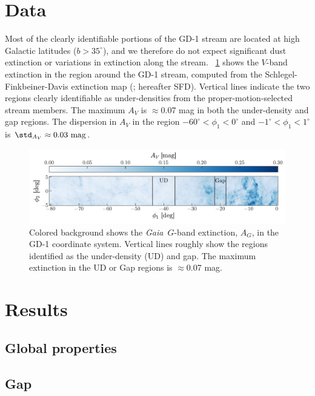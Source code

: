 \documentclass[modern]{aastex62}
\newcommand{\gaia}{\textsl{Gaia}}
\begin{document}
\section{Data}
\label{sec:data}


Most of the clearly identifiable portions of the GD-1 stream are located at high
Galactic latitudes ($b > 35^\circ$), and we therefore do not expect significant
dust extinction or variations in extinction along the stream.
\figurename~\ref{fig:sfd} shows the $V$-band extinction in the region around the
GD-1 stream, computed from the Schlegel-Finkbeiner-Davis extinction map
(\cite{Schlegel:1998}; hereafter SFD).
Vertical lines indicate the two regions clearly identifiable as under-densities
from the proper-motion-selected stream members.
The maximum $A_V$ is $\approx$0.07 mag in both the under-density and gap
regions.
The dispersion in $A_V$ in the region $-60^\circ < \phi_1 < 0^\circ$ and
$-1^\circ < \phi_1 < 1^\circ$ is $\std_{A_V} \approx 0.03~\textrm{mag}$.

\begin{figure}[h]
\begin{center}
\includegraphics[width=\textwidth]{sfd.pdf}
\end{center}
\caption{%
Colored background shows the \gaia\ $G$-band extinction, $A_G$, in the GD-1
coordinate system.
Vertical lines roughly show the regions identified as the under-density (UD) and
gap.
The maximum extinction in the UD or Gap regions is $\approx$0.07 mag.
\label{fig:sfd}
}
\end{figure}


\section{Results}
\label{sec:results}

\subsection{Global properties}
\label{sec:res_global}

\subsection{Gap}
\label{sec:res_gap}
\end{document}
